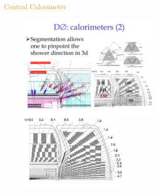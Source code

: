 \begin{frame}{\textcolor{Goldenrod}{Central Calorimeter}}
  \begin{overlayarea}{\textwidth}{\textheight}
    \begin{figure}[h]
      \centering
      \includegraphics[height=0.4\textheight, width=0.6\textwidth]{./Images/40_CAL_showers_01.pdf}
      \includegraphics[height=0.4\textheight, width=0.45\textwidth]{./Images/38_CAL_central.jpg}
      
    \end{figure}

    \itt[<only@+>]
    

\end{overlayarea}
\end{frame}
